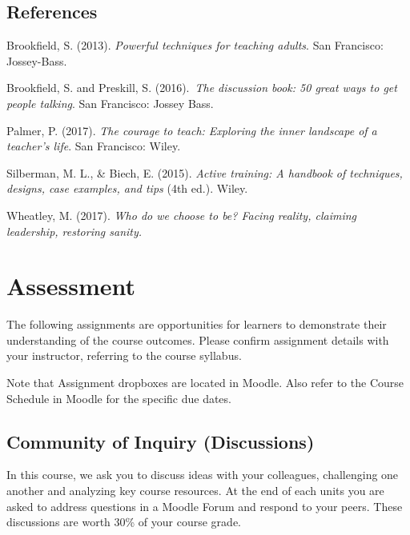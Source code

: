 \documentclass[
]{book}
\begin{document}
\hypertarget{references-5}{%
\section*{References}\label{references-5}}

Brookfield, S. (2013). \emph{Powerful techniques for teaching adults}. San Francisco: Jossey-Bass.

Brookfield, S. and Preskill, S. (2016).~\emph{The discussion book: 50 great ways to get people talking}. San Francisco: Jossey Bass. ~

Palmer, P. (2017). \emph{The courage to teach: Exploring the inner landscape of a teacher's life}. San Francisco: Wiley.

Silberman, M. L., \& Biech, E. (2015). \emph{Active training: A handbook of techniques, designs, case examples, and tips} (4th ed.). Wiley.

Wheatley, M. (2017). \emph{Who do we choose to be? Facing reality, claiming leadership, restoring sanity. }

\hypertarget{assessment-10}{%
\chapter*{Assessment}\label{assessment-10}}

The following assignments are opportunities for learners to demonstrate their understanding of the course outcomes. Please confirm assignment details with your instructor, referring to the course syllabus.

Note that Assignment dropboxes are located in Moodle. Also refer to the Course Schedule in Moodle for the specific due dates.

\hypertarget{community-of-inquiry-discussions}{%
\section*{Community of Inquiry (Discussions)}\label{community-of-inquiry-discussions}}

\begin{assessment}
In this course, we ask you to discuss ideas with your colleagues,
challenging one another and analyzing key course resources. At the end
of each units you are asked to address questions in a Moodle Forum and
respond to your peers. These discussions are worth 30\% of your course
grade.
\end{assessment}
\end{document}
